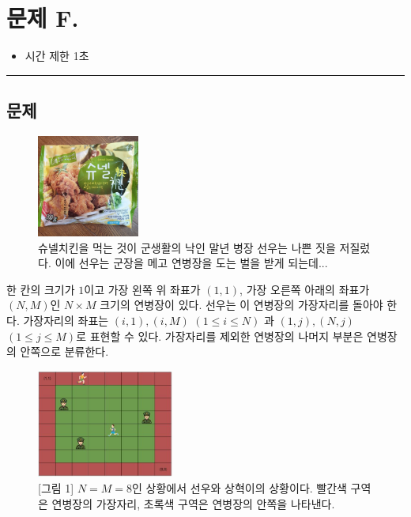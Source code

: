 \newpage
\section*{{\Large 문제 F.} }

\begin{itemize}
    \item 시간 제한 \tabto{2cm} 1초
\end{itemize}

\hrule

\subsection*{문제}

\begin{figure}[h]
    \centering
    \includegraphics[width=0.3\textwidth]{problems/image/sunel_real.jpeg}
    \caption{슈넬치킨을 먹는 것이 군생활의 낙인 말년 병장 선우는 나쁜 짓을 저질렀다. 이에 선우는 군장을 메고 연병장을 도는 벌을 받게 되는데...}
\end{figure}

한 칸의 크기가 $1$이고 가장 왼쪽 위 좌표가 $(1,1)$, 가장 오른쪽 아래의 좌표가 $(N,M)$인 $N×M$ 크기의 연병장이 있다. 선우는 이 연병장의 가장자리를 돌아야 한다. 가장자리의 좌표는 $(i,1), (i,M)$ $(1\leq i\leq N)$ 과 $(1,j), (N,j)$ $(1\leq j\leq M)$로 표현할 수 있다. 가장자리를 제외한 연병장의 나머지 부분은 연병장의 안쪽으로 분류한다.

\begin{figure}[h]
    \centering
    \includegraphics[width=0.4\textwidth]{problems/image/sunel_1.jpeg}
    \captionsetup{width=0.55\textwidth}
    \caption{[그림 1] $N=M=8$인 상황에서 선우와 상혁이의 상황이다. 빨간색 구역은 연병장의 가장자리, 초록색 구역은 연병장의 안쪽을 나타낸다.}
\end{figure}

